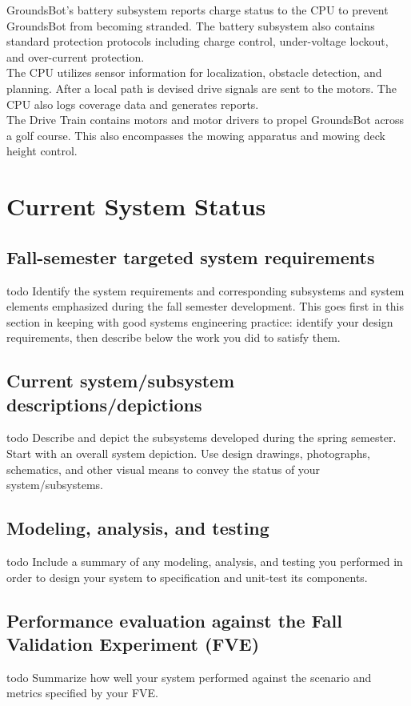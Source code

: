 \documentclass[12pt]{extarticle}
\begin{document}
  GroundsBot's battery subsystem reports charge status to the CPU to prevent GroundsBot from becoming stranded. The battery subsystem also contains standard protection protocols including charge control, under-voltage lockout, and over-current protection. \\

  The CPU utilizes sensor information for localization, obstacle detection, and planning. After a local path is devised drive signals are sent to the motors. The CPU also logs coverage data and generates reports.\\

  The Drive Train contains motors and motor drivers to propel GroundsBot across a golf course. This also encompasses the mowing apparatus and mowing deck height control. \\

\newpage


\section{Current System Status}
  \subsection{Fall-semester targeted system requirements}
  todo
  Identify the system requirements and
  corresponding subsystems and system elements emphasized during the fall semester
  development. This goes first in this section in keeping with good systems engineering
  practice: identify your design requirements, then describe below the work you did to satisfy
  them.
  \subsection{Current system/subsystem descriptions/depictions}
   todo
   Describe and depict the subsystems developed during the spring semester. Start with an overall system depiction. Use design
  drawings, photographs, schematics, and other visual means to convey the status of your
  system/subsystems.
  \subsection{Modeling, analysis, and testing}
  todo
  Include a summary of any modeling, analysis, and testing
  you performed in order to design your system to specification and unit-test its components.
  \subsection{Performance evaluation against the Fall Validation Experiment (FVE)}
   todo
   Summarize how well your system performed against the scenario and metrics specified by your FVE.
\end{document}
